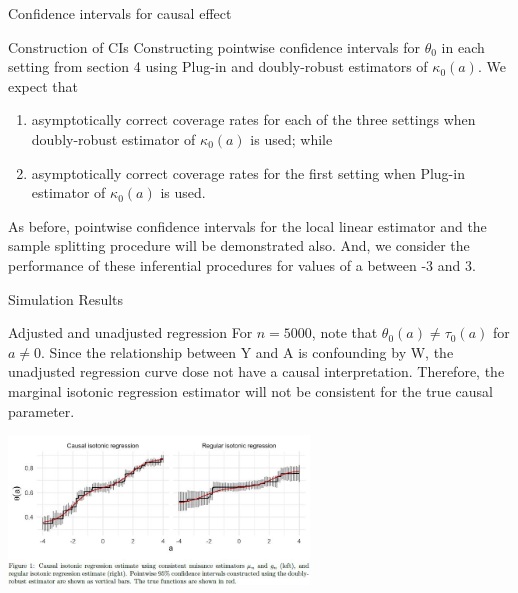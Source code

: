 \documentclass{beamer}
\begin{document}
\begin{frame}{Confidence intervals for causal effect}

\begin{block}{Construction of CIs}
	Constructing pointwise confidence intervals for $\theta_0$ in each setting from section 4 using Plug-in and doubly-robust estimators of $\kappa_0(a)$. We expect that
	\begin{enumerate}
	\item asymptotically correct coverage rates for each of the three settings when doubly-robust estimator of $\kappa_0(a)$ is used; while
	\item asymptotically correct coverage rates for the first setting when Plug-in estimator of $\kappa_0(a)$ is used.
	\end{enumerate}
	As before, pointwise confidence intervals for the local linear estimator and the sample splitting procedure will be demonstrated also. And, we consider the performance of these inferential procedures for values of a between -3 and 3.
\end{block}

\end{frame}


\begin{frame}{Simulation Results}

\begin{block}{Adjusted and unadjusted regression}
	For $n =5000$, note that $\theta_0(a)\neq\tau_0(a)$ for $a\neq 0$. Since the relationship between Y and A is confounding by W, the unadjusted regression curve dose not have a causal interpretation. Therefore, the marginal isotonic regression estimator will not be consistent for the true causal parameter.
\end{block}

\includegraphics[width=8cm]{Causal Isotonic Regression/CIRS501}

\end{frame}

\end{document}
